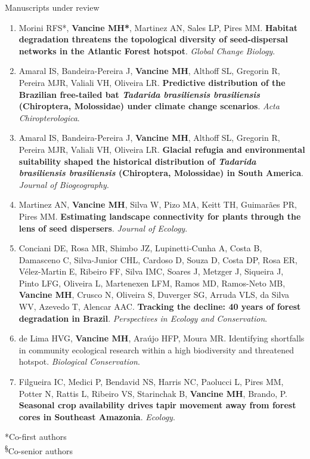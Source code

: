 \documentclass{resume}
\begin{document}
\begin{rSection}{Manuscripts under review}

\begin{enumerate} 
\item Morini RFS*, \textbf{Vancine MH*}, Martinez AN, Sales LP, Pires MM. \textbf{Habitat degradation threatens the topological diversity of seed-dispersal networks in the Atlantic Forest hotspot}. \textit{Global Change Biology}.

\item Amaral IS, Bandeira-Pereira J, \textbf{Vancine MH}, Althoff SL, Gregorin R, Pereira MJR, Valiali VH, Oliveira LR. \textbf{Predictive distribution of the Brazilian free-tailed bat \textit{Tadarida brasiliensis brasiliensis} (Chiroptera, Molossidae) under climate change scenarios}. \textit{Acta Chiropterologica}.

\item Amaral IS, Bandeira-Pereira J, \textbf{Vancine MH}, Althoff SL, Gregorin R, Pereira MJR, Valiali VH, Oliveira LR. \textbf{Glacial refugia and environmental suitability shaped the historical distribution of \textit{Tadarida brasiliensis brasiliensis} (Chiroptera, Molossidae) in South America}. \textit{Journal of Biogeography}.

\item Martinez AN, \textbf{Vancine MH}, Silva W, Pizo MA, Keitt TH, Guimarães PR, Pires MM. \textbf{Estimating landscape connectivity for plants through the lens of seed dispersers}. \textit{Journal of Ecology}.

\item Conciani DE, Rosa MR, Shimbo JZ, Lupinetti-Cunha A, Costa B, Damasceno C, Silva-Junior CHL, Cardoso D, Souza D, Costa DP, Rosa ER, Vélez-Martin E, Ribeiro FF, Silva IMC, Soares J, Metzger J, Siqueira J, Pinto LFG, Oliveira L, Martenexen LFM, Ramos MD, Ramos-Neto MB, \textbf{Vancine MH}, Crusco N, Oliveira S, Duverger SG, Arruda VLS, da Silva WV, Azevedo T, Alencar AAC. \textbf{Tracking the decline: 40 years of forest degradation in Brazil}. \textit{Perspectives in Ecology and Conservation}.

\item de Lima HVG, \textbf{Vancine MH}, Araújo HFP, Moura MR. Identifying shortfalls in community ecological research within a high biodiversity and threatened hotspot. \textit{Biological Conservation}.

\item Filgueira IC, Medici P, Bendavid NS, Harris NC, Paolucci L, Pires MM, Potter N, Rattis L, Ribeiro VS, Starinchak B, \textbf{Vancine MH}, Brando, P. \textbf{Seasonal crop availability drives tapir movement away from forest cores in Southeast Amazonia}. \textit{Ecology}.

\end{enumerate} 

*Co-first authors\\
\textsuperscript{\S}Co-senior authors

\end{rSection}
\end{document}
